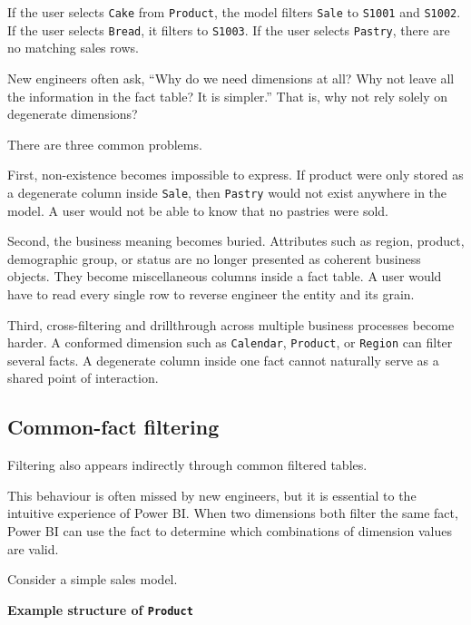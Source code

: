 \documentclass[10pt,openany,10pt]{book}
\begin{document}
If the user selects \texttt{Cake} from
\texttt{\textquotesingle{}Product\textquotesingle{}}, the model filters
\texttt{\textquotesingle{}Sale\textquotesingle{}} to \texttt{S1001} and
\texttt{S1002}. If the user selects \texttt{Bread}, it filters to
\texttt{S1003}. If the user selects \texttt{Pastry}, there are no
matching sales rows.

New engineers often ask, ``Why do we need dimensions at all? Why not
leave all the information in the fact table? It is simpler.'' That is,
why not rely solely on degenerate dimensions?

There are three common problems.

First, non-existence becomes impossible to express. If product were only
stored as a degenerate column inside
\texttt{\textquotesingle{}Sale\textquotesingle{}}, then \texttt{Pastry}
would not exist anywhere in the model. A user would not be able to know
that no pastries were sold.

Second, the business meaning becomes buried. Attributes such as region,
product, demographic group, or status are no longer presented as
coherent business objects. They become miscellaneous columns inside a
fact table. A user would have to read every single row to reverse
engineer the entity and its grain.

Third, cross-filtering and drillthrough across multiple business
processes become harder. A conformed dimension such as
\texttt{\textquotesingle{}Calendar\textquotesingle{}},
\texttt{\textquotesingle{}Product\textquotesingle{}}, or
\texttt{\textquotesingle{}Region\textquotesingle{}} can filter several
facts. A degenerate column inside one fact cannot naturally serve as a
shared point of interaction.

\subsection{Common-fact filtering}\label{common-fact-filtering}

Filtering also appears indirectly through common filtered tables.

This behaviour is often missed by new engineers, but it is essential to
the intuitive experience of Power BI. When two dimensions both filter
the same fact, Power BI can use the fact to determine which combinations
of dimension values are valid.

Consider a simple sales model.

\textbf{Example structure of
\texttt{\textquotesingle{}Product\textquotesingle{}}}
\end{document}
